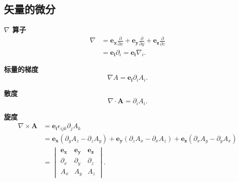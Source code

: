 \subsection{矢量的微分}
\textbf{$\nabla$ 算子}
\begin{equation}
    \begin{aligned}
        \nabla & =\bm{e_x}\frac{\partial}{\partial x}+\bm{e_y}\frac{\partial}{\partial y}+\bm{e_z}\frac{\partial}{\partial z} \\
               & =\bm{e_i}\partial_i=\bm{e_i}\nabla_i.
    \end{aligned}
\end{equation}

\textbf{标量的梯度}
\begin{equation}
    \nabla A=\bm{e_i}\partial_iA_i.
\end{equation}

\textbf{散度}
\begin{equation}
    \nabla\cdot\bm{A}=\partial_iA_i.
\end{equation}

\textbf{旋度}
\begin{equation}
    \begin{aligned}
        \nabla\times\bm{A} & =\bm{e_i}\epsilon_{ijk}\partial_jA_k                                                                               \\
                           & =\bm{e_x}(\partial_yA_z-\partial_zA_y)+\bm{e_y}(\partial_zA_x-\partial_xA_z)+\bm{e_z}(\partial_xA_y-\partial_yA_x) \\
                           & =\begin{vmatrix}
                                  \bm{e_x}   & \bm{e_y}   & \bm{e_z}   \\
                                  \partial_x & \partial_y & \partial_z \\
                                  A_x        & A_y        & A_z
                              \end{vmatrix}.
    \end{aligned}
\end{equation}
